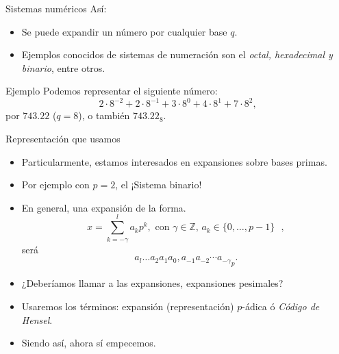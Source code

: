 \documentclass{beamer}
\theoremstyle{definition}
\numberwithin{equation}{section}
\newcommand{\tit}[1]{\textit{#1}}
\newcommand{\Z}{\mathbb{Z}}
\begin{document}
  \begin{frame}{Sistemas numéricos}
  	Así:
  	\begin{itemize}
  		\item Se puede expandir un número por cualquier base $q$.
 		\item Ejemplos conocidos de sistemas de numeración son el \tit{octal, hexadecimal y binario}, entre otros.
  	\end{itemize}
  \begin{exampleblock}{Ejemplo}
	Podemos representar el siguiente número:
	$$2\cdot8^{-2}+2\cdot8^{-1}+3\cdot8^0+4\cdot8^1+7\cdot8^2,$$
	por $743.22$ ($q=8$), o también $743.22_8$.
  \end{exampleblock}
	 
  \end{frame}

\begin{frame}{Representación que usamos}
	\begin{itemize}[<+- | alert@+>]
		\item Particularmente, estamos interesados en expansiones sobre bases primas.
		\item Por ejemplo con $p=2$, el ¡Sistema binario!
		\item En general, una expansión de la forma.	$$x=\sum_{k=-\gamma}^{l}a_kp^k,\text{ con $\gamma\in\Z$, $a_k\in \{0,\dots,p-1\}$ },$$
		será
		\begin{equation}\label{notacion}
		{a_{l} \ldots a_{2} a_{1} a_{0},a_{-1}a_{-2}\cdots a_{-\gamma}}_p.
		\end{equation}
		\item ¿Deberíamos llamar a las expansiones, expansiones pesimales?
		\item Usaremos los términos: expansión (representación) $p$-ádica ó \tit{Código de Hensel}.
		\item Siendo así, ahora sí empecemos.
	\end{itemize}

\end{frame}
\end{document}
